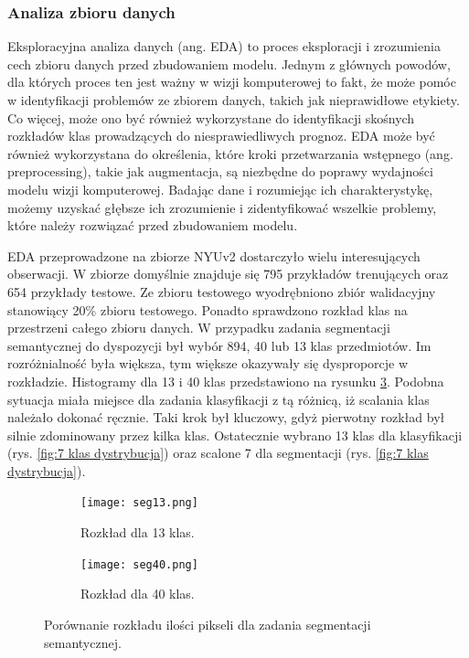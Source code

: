 \subsubsection{Analiza zbioru danych}
Eksploracyjna analiza danych (ang. EDA) to proces eksploracji i zrozumienia cech zbioru danych przed zbudowaniem modelu. Jednym z głównych powodów, dla których proces ten jest ważny w wizji komputerowej to fakt, że może pomóc w identyfikacji problemów ze zbiorem danych, takich jak nieprawidłowe etykiety. Co więcej, może ono być również wykorzystane do identyfikacji skośnych rozkładów klas prowadzących do niesprawiedliwych prognoz. EDA może być również wykorzystana do określenia, które kroki przetwarzania wstępnego (ang. preprocessing), takie jak augmentacja, są niezbędne do poprawy wydajności modelu wizji komputerowej. Badając dane i rozumiejąc ich charakterystykę, możemy uzyskać głębsze ich zrozumienie i zidentyfikować wszelkie problemy, które należy rozwiązać przed zbudowaniem modelu.

EDA przeprowadzone na zbiorze NYUv2 dostarczyło wielu interesujących obserwacji. W zbiorze domyślnie znajduje się 795 przykładów trenujących oraz 654 przykłady testowe. Ze zbioru testowego wyodrębniono zbiór walidacyjny stanowiący 20\% zbioru testowego. Ponadto sprawdzono rozkład klas na przestrzeni całego zbioru danych.
W przypadku zadania segmentacji semantycznej do dyspozycji był wybór 894, 40 lub 13 klas przedmiotów. Im rozróżnialność była większa, tym większe okazywały się dysproporcje w rozkładzie. Histogramy dla 13 i 40 klas przedstawiono na rysunku \ref{fig:rozklad-segm}.
Podobna sytuacja miała miejsce dla zadania klasyfikacji z tą różnicą, iż scalania klas należało dokonać ręcznie. Taki krok był kluczowy, gdyż pierwotny rozkład był silnie zdominowany przez kilka klas.
Ostatecznie wybrano 13 klas dla klasyfikacji (rys. \ref{fig:7 klas dystrybucja}) oraz scalone 7 dla segmentacji (rys. \ref{fig:7 klas dystrybucja}).

\begin{figure}[ht!]
\centering
\begin{subfigure}[b]{0.49\textwidth}
\centering
\texttt{[image: seg13.png]}
\caption{Rozkład dla 13 klas.}
\label{fig:rozklad-13klas-seg}
\end{subfigure}
\hfill
\begin{subfigure}[b]{0.49\textwidth}
\centering
\texttt{[image: seg40.png]}
\caption{Rozkład dla 40 klas.}
\label{fig:rozklad-40klas-seg}
\end{subfigure}
\caption[]{Porównanie rozkładu ilości pikseli dla zadania segmentacji semantycznej.}
\label{fig:rozklad-segm}
\end{figure}

